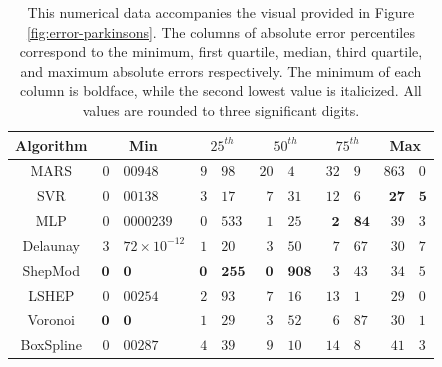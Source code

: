 \documentclass[smallextended,final]{svjour3}  %
\begin{document}
\begin{appendix}
\begin{table}
  \centering
  \begin{tabular}{c|r@{.}l|r@{.}l|r@{.}l|r@{.}l|r@{.}l}
    \hline
    Algorithm & \multicolumn{2}{c|}{Min} & \multicolumn{2}{c|}{$25^{th}$} & \multicolumn{2}{c|}{$50^{th}$} & \multicolumn{2}{c|}{$75^{th}$} & \multicolumn{2}{c}{Max}\\
    \hline
    MARS & $0$&$00948$ & $9$&$98$ & $20$&$4$ & $32$&$9$ & $863$&$0$\\
    SVR & $0$&$00138$ & $3$&$17$ & $7$&$31$ & $12$&$6$ & $\mathbf{27}$&$\mathbf{5}$\\
    MLP & $0$&$0000239$ & $\mathit{0}$&$\mathit{533}$ & $\mathit{1}$&$\mathit{25}$ & $\mathbf{2}$&$\mathbf{84}$ & $39$&$3$\\
    Delaunay & $\mathit{3}$&$\mathit{72 \times 10^{-12}}$ & $1$&$20$ & $3$&$50$ & $7$&$67$ & $30$&$7$\\
    ShepMod & $\mathbf{0}$&$\mathbf{0}$ & $\mathbf{0}$&$\mathbf{255}$ & $\mathbf{0}$&$\mathbf{908}$ & $\mathit{3}$&$\mathit{43}$ & $34$&$5$\\
    LSHEP & $0$&$00254$ & $2$&$93$ & $7$&$16$ & $13$&$1$ & $\mathit{29}$&$\mathit{0}$\\
    Voronoi & $\mathbf{0}$&$\mathbf{0}$ & $1$&$29$ & $3$&$52$ & $6$&$87$ & $30$&$1$\\
    BoxSpline & $0$&$00287$ & $4$&$39$ & $9$&$10$ & $14$&$8$ & $41$&$3$\\
    \hline
  \end{tabular}
  \caption{This numerical data accompanies the visual provided in
    Figure \ref{fig:error-parkinsons}. The columns of absolute error
    percentiles correspond to the minimum, first quartile, median,
    third quartile, and maximum absolute errors respectively. The
    minimum of each column is boldface, while the second lowest value
    is italicized. All values are rounded to three significant
    digits.}
  \label{table:error-parkinsons}
\end{table}


\end{appendix}
\end{document}
